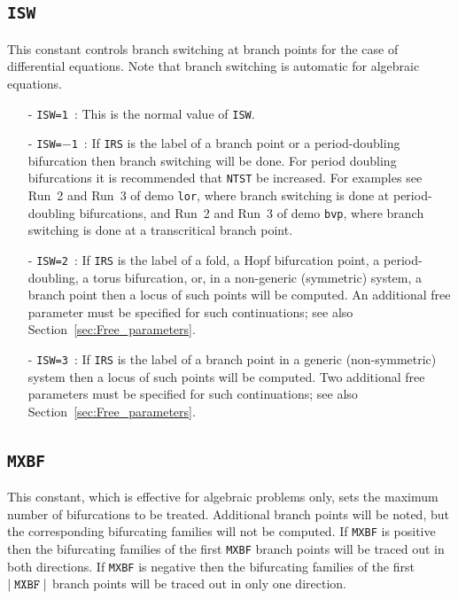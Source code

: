 \documentclass[12pt]{report}
\def\abs#1{\mid#1\mid}
\begin{document}
\subsection{\tt ISW}  \label{sec:ISW}
 This constant controls branch switching at branch points for the case
 of differential equations.
 Note that branch switching is automatic for algebraic equations.
\begin{itemize}
\item[-] {\tt ISW=1}~: This is the normal value of {\tt ISW}.
\item[-] {\tt ISW=$-$1}~:
  If {\tt IRS} is the label of a branch point or a period-doubling
  bifurcation then branch switching will be done.
  For period doubling bifurcations it is recommended that {\tt NTST} be increased.
  For examples see Run~2 and Run~3 of demo {\tt lor}, where branch switching
  is done at period-doubling bifurcations, and Run~2 and Run~3 of demo {\tt bvp},
  where branch switching is done at a transcritical branch point.
\item[-] {\tt ISW=2}~:
  If {\tt IRS} is the label of a fold, a Hopf bifurcation point, 
  a period-doubling, a torus bifurcation, or, in a non-generic
  (symmetric) system, a branch point then a locus of such points will be
  computed. An additional free parameter must be specified for such 
  continuations; see also Section~\ref{sec:Free_parameters}.
\item[-] {\tt ISW=3}~:
  If {\tt IRS} is the label of a branch point in a generic
  (non-symmetric) system then a locus of such points will be
  computed. Two additional free parameters must be specified for such 
  continuations; see also Section~\ref{sec:Free_parameters}.
\end{itemize}

\subsection{\tt MXBF}  \label{sec:MXBF}
 This constant, which is effective for algebraic problems only,
 sets the maximum number of bifurcations to be treated.
 Additional branch points will be noted, but the corresponding bifurcating
 families will not be computed.
 If {\tt MXBF} is positive then the bifurcating families of the first {\tt MXBF}
  branch points will be traced out in both directions.
 If {\tt MXBF} is negative then the bifurcating families of the first 
 $\abs{{\tt MXBF}}$ branch points will be traced out in only one direction. 
\end{document}
